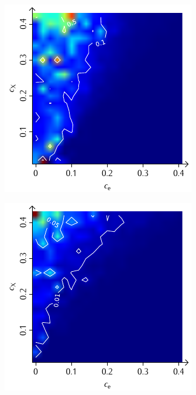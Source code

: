 \documentclass[a4paper, 10pt, twoside, openany]{book} %
\begin{document}
\begin{figure}
\begin{minipage}[t]{0.48\textwidth}
        \label{F_penalty_cluster_G}
    \end{minipage}
    \begin{minipage}[t]{0.48\textwidth}
        \includegraphics[width=\textwidth]{Abbildungen/Phasendiagramme/Konturen/F_random_G.pdf}
        \label{F_random_G}
    \end{minipage}
    \hfill
    \begin{minipage}[t]{0.48\textwidth}
        \includegraphics[width=\textwidth]{Abbildungen/Phasendiagramme/Konturen/F_penalty_random_G.pdf}

\end{minipage}
\end{figure}
\end{document}
